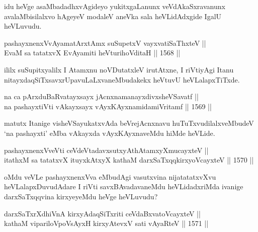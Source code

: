 \begin{artha}
idu heVge asaMbadadhxvAgideyo yukitxgaLanunx veVdAkaSxravanunx avalaMbisilalxvo hAgeyeV modaleV aneVka sala heVLidAdxgide IgalU heVLuvudu.
\end{artha}


\begin{shl}
pashayxnenxVvAyamatArx\s \s tAmx suSupetxV vayxvatiSaThxteV ||  \\
EvaM sa tatatxvX EvAyamiti heVturihoVditaH \hfill || 1568 ||  
\end{shl}

\begin{artha}
ililx suSupitxyalilx I Atamxnu noVDutatxleV irutAtxne, I riVtiyAgi Itanu nitayxdaqSiTxsavxrUpavuLaLxvaneMbudakekx heVtuvU heVLalapxTiTxde.
\end{artha}

\begin{shl}
na ca pArxduBaRvatayxsayx jAcnxnamanayxdivxsheVSavatf ||  \\
na pashayxtiVti vAkayxsayx vAyxKAyxnamidamiVritamf \hfill || 1569 ||  
\end{shl}

\begin{artha}
matutx Itanige visheVSayukatxvAda beVrejAcnxnavu huTuTxvudilalxveMbudeV `na pashayxti' eMba vAkayxda vAyxKAyxnaveMdu hiMde heVLide.
\end{artha}

\begin{shl}
pashayxnenxVveVti ceVdeVtadavxsutxyAthAtamxyXmucayxteV || \\
itathxM sa tatatxvX ituyxkAtxyX kathaM darxSaTxqqkirxyoVcayxteV \hfill || 1570 ||  
\end{shl}

\begin{artha}
oMdu veVLe pashayxnenxVva eMbudAgi vasutxvina nijatatatxvXvu heVLalapxDuvudAdare I riVti savxBAvadavaneMdu heVLidadxriMda ivanige darxSaTxqqvina kirxyeyeMdu heVge heVLuvudu? 
\end{artha}


\begin{shl}
darxSaTxrXdhiVnA kirxyAdaqSiTxriti ceVdaBxvatoVcayxteV ||  \\
kathaM vipariloVpoV\s sAyxH kirxyAtevxV sati vAyaRteV \hfill || 1571 ||  
\end{shl}

